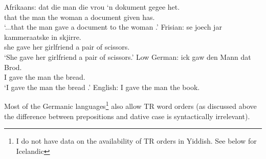 \begin{exe}
\begin{xlist}
\ex Afrikaans:\label{ex:af-rt}
\gll dat die man die vrou `n dokument gegee het.\\
that the man the woman a document given has.\\
\trans `...that the man gave a document to the woman \citep{Louw.2012}.'
\ex Frisian:\label{ex:fri-rt}
\gll se joech jar kammeraatske in skjirre.\\
she gave her girlfriend a {pair of scissors}.\\
\trans `She gave her girlfriend a pair of scissors.'
\ex Low German: \label{ex:lg-rt}
\gll ick gaw den Mann dat Brod.\\
I gave the man the bread.\\
\trans `I gave the man the bread \citep{Mussaus.1829}.'
\ex English: I gave the man the book.\label{ex:eng-rt}
\end{xlist}
\end{exe}

Most of the Germanic languages\footnote{I do not have data on the availability of TR orders in Yiddish. See below for Icelandic} also allow TR word orders (as discussed above the difference between prepositions and dative case is syntactically irrelevant).

